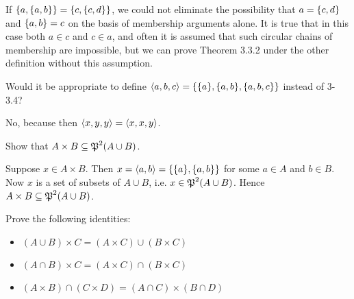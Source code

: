 \begin{solution}
If $\left\{a, \left\{a,b\right\}\right\} = \left\{c, \left\{c,d\right\}\right\}$, we could not eliminate the possibility that $a = \left\{c,d\right\}$
and $\left\{a, b\right\} = c$ on the basis of membership arguments alone. It is true that in this case
both $a\in c$ and $c\in a$, and often it is assumed that such circular chains of membership
are impossible, but we can prove Theorem 3.3.2 under the other definition without this
assumption.
\end{solution}

\begin{exercise}
Would it be appropriate to define $\aprn{a,b,c} = \set{\set{a},\set{a,b},\set{a,b,c}}$ instead of 3-3.4?
\end{exercise}

\begin{solution}
    No, because then $\left\langle x,y,y\right\rangle=\left\langle x,x,y\right\rangle$.
\end{solution}

\begin{exercise}
Show that $A\times B\subseteq\operatorname{\mathfrak{P}}^2(A\cup B)$.
\end{exercise}

\begin{solution}
Suppose $x\in A\times B$. Then $x=\aprn{a,b}=\set{\set{a},\set{a,b}}$ for some $a\in A$ and $b\in B$.
Now $x$ is a set of subsets of $A\cup B$, i.e. $x\in\operatorname{\mathfrak{P}}^2(A\cup B)$.
Hence $A\times B\subseteq \operatorname{\mathfrak{P}}^2(A\cup B)$.
\end{solution}

\begin{exercise}
Prove the following identities:
\begin{itemize}
    \item $(A\cup B)\times C = (A\times C)\cup (B\times C)$
    \item $(A\cap B)\times C = (A\times C)\cap (B\times C)$
    \item $(A\times B)\cap (C\times D) = (A\cap C)\times (B\cap D)$
\end{itemize}
\end{exercise}

